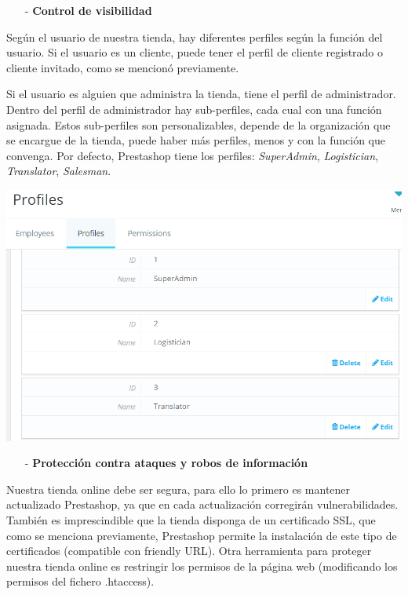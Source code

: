 \documentclass{article}
\begin{document}
\begin{itemize}
\item[-] \textbf{Control de visibilidad}
\end{itemize}

Según el usuario de nuestra tienda, hay diferentes perfiles según la función del usuario.
Si el usuario es un cliente, puede tener el perfil de cliente registrado o cliente invitado, como se mencionó previamente.

Si el usuario es alguien que administra la tienda, tiene el perfil de administrador. Dentro del perfil de administrador hay sub-perfiles, cada cual con una función asignada. Estos sub-perfiles son personalizables, depende de la organización que se encargue de la tienda, puede haber más perfiles, menos y con la función que convenga. Por defecto, Prestashop tiene los perfiles: \textit{SuperAdmin}, \textit{Logistician}, \textit{Translator}, \textit{Salesman}.

\begin{center}
\includegraphics[scale=0.4]{images/profiles.png}
\end{center}

\begin{itemize}
\item[-] \textbf{Protección contra ataques y robos de información}
\end{itemize}

Nuestra tienda online debe ser segura, para ello lo primero es mantener actualizado Prestashop, ya que en cada actualización corregirán vulnerabilidades. También es imprescindible que la tienda disponga de un certificado SSL, que como se menciona previamente, Prestashop permite la instalación de este tipo de certificados (compatible con friendly URL). Otra herramienta para proteger nuestra tienda online es restringir los permisos de la página web (modificando los permisos del fichero .htaccess). 
\end{document}
